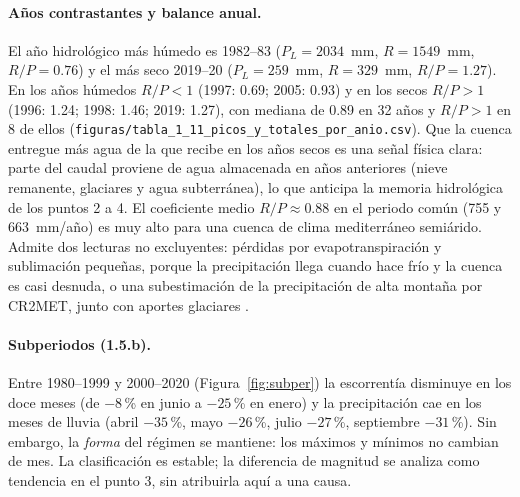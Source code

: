 \documentclass[11pt,a4paper]{article}
\newcommand{\archivo}[1]{\nolinkurl{#1}}
\newcommand{\PL}{P_L}
\begin{document}
\paragraph{Años contrastantes y balance anual.} El año hidrológico más húmedo es 1982--83 ($\PL=2034$~mm, $R=1549$~mm, $R/P=0.76$) y el más seco 2019--20 ($\PL=259$~mm, $R=329$~mm, $R/P=1.27$). En los años húmedos $R/P<1$ (1997: 0.69; 2005: 0.93) y en los secos $R/P>1$ (1996: 1.24; 1998: 1.46; 2019: 1.27), con mediana de 0.89 en 32 años y $R/P>1$ en 8 de ellos (\archivo{figuras/tabla_1_11_picos_y_totales_por_anio.csv}). Que la cuenca entregue más agua de la que recibe en los años secos es una señal física clara: parte del caudal proviene de agua almacenada en años anteriores (nieve remanente, glaciares y agua subterránea), lo que anticipa la memoria hidrológica de los puntos 2 a 4. El coeficiente medio $R/P\approx0.88$ en el periodo común (755 y 663~mm/año) es muy alto para una cuenca de clima mediterráneo semiárido. Admite dos lecturas no excluyentes: pérdidas por evapotranspiración y sublimación pequeñas, porque la precipitación llega cuando hace frío y la cuenca es casi desnuda, o una subestimación de la precipitación de alta montaña por CR2MET, junto con aportes glaciares \citep{Ayala2020,AlvarezGarreton2018}.

\paragraph{Subperiodos (1.5.b).} Entre 1980--1999 y 2000--2020 (Figura~\ref{fig:subper}) la escorrentía disminuye en los doce meses (de $-8$\,\% en junio a $-25$\,\% en enero) y la precipitación cae en los meses de lluvia (abril $-35$\,\%, mayo $-26$\,\%, julio $-27$\,\%, septiembre $-31$\,\%). Sin embargo, la \emph{forma} del régimen se mantiene: los máximos y mínimos no cambian de mes. La clasificación es estable; la diferencia de magnitud se analiza como tendencia en el punto 3, sin atribuirla aquí a una causa.
\end{document}
